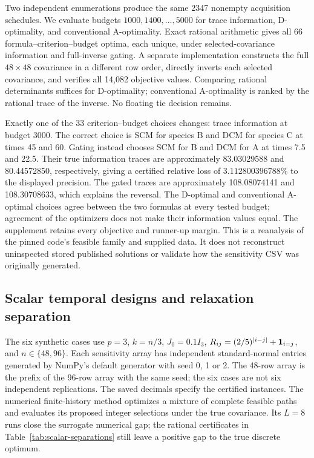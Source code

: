 Two independent enumerations produce the same 2347 nonempty acquisition
schedules. We evaluate budgets $1000,1400,\ldots,5000$ for trace information,
D-optimality, and conventional A-optimality. Exact rational arithmetic gives
all 66 formula--criterion--budget optima, each unique, under selected-covariance
information and full-inverse gating. A separate implementation constructs the
full $48\times48$ covariance in a different row order, directly inverts each
selected covariance, and verifies all 14,082 objective values. Comparing
rational determinants suffices for D-optimality; conventional A-optimality is
ranked by the rational trace of the inverse. No floating tie decision remains.

Exactly one of the 33 criterion--budget choices changes: trace information
at budget 3000. The correct choice is SCM for species B and DCM for species C
at times 45 and 60. Gating instead chooses SCM for B and DCM for A at times
7.5 and 22.5. Their true information traces are approximately 83.03029588 and
80.44572850, respectively, giving a certified relative loss of
$3.112800396788\%$ to the displayed precision. The gated traces are approximately
108.08074141 and 108.30708633, which explains the reversal. The D-optimal and
conventional A-optimal choices agree between the two formulas at every tested
budget; agreement of the optimizers does not make their information values
equal. The supplement retains
every objective and runner-up margin. This is a reanalysis of the pinned
code's feasible family and supplied data. It does not reconstruct uninspected
stored published solutions or validate how the sensitivity CSV was originally
generated.

\subsection{Scalar temporal designs and relaxation separation}
\label{subsec:scalar-experiments}

The six synthetic cases use $p=3$, $k=n/3$, $J_0=0.1I_3$,
$R_{ij}=(2/5)^{|i-j|}+\mathbf 1_{i=j}$, and $n\in\{48,96\}$.
Each sensitivity array has independent standard-normal entries generated
by NumPy's default generator with seed 0, 1 or 2. The 48-row array is the
prefix of the 96-row array with the same seed; the six cases are not six
independent replications. The saved decimals specify the certified instances.
The numerical finite-history method optimizes a mixture of complete feasible
paths and evaluates its proposed integer selections under the true covariance.
Its $L=8$ runs close the surrogate numerical gap; the rational certificates
in Table~\ref{tab:scalar-separations} still leave a positive gap to the true
discrete optimum.

